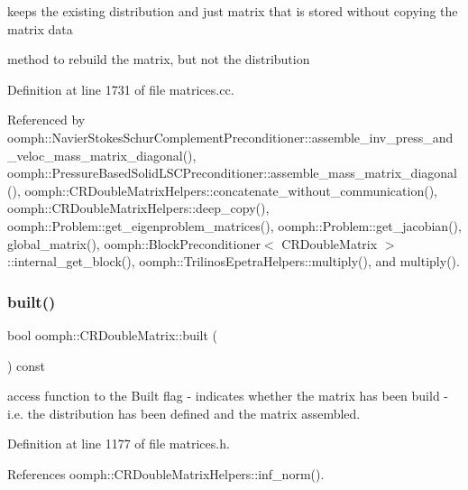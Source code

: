 keeps the existing distribution and just matrix that is stored without copying the matrix data 

method to rebuild the matrix, but not the distribution 

Definition at line 1731 of file matrices.\+cc.



Referenced by oomph\+::\+Navier\+Stokes\+Schur\+Complement\+Preconditioner\+::assemble\+\_\+inv\+\_\+press\+\_\+and\+\_\+veloc\+\_\+mass\+\_\+matrix\+\_\+diagonal(), oomph\+::\+Pressure\+Based\+Solid\+L\+S\+C\+Preconditioner\+::assemble\+\_\+mass\+\_\+matrix\+\_\+diagonal(), oomph\+::\+C\+R\+Double\+Matrix\+Helpers\+::concatenate\+\_\+without\+\_\+communication(), oomph\+::\+C\+R\+Double\+Matrix\+Helpers\+::deep\+\_\+copy(), oomph\+::\+Problem\+::get\+\_\+eigenproblem\+\_\+matrices(), oomph\+::\+Problem\+::get\+\_\+jacobian(), global\+\_\+matrix(), oomph\+::\+Block\+Preconditioner$<$ C\+R\+Double\+Matrix $>$\+::internal\+\_\+get\+\_\+block(), oomph\+::\+Trilinos\+Epetra\+Helpers\+::multiply(), and multiply().

\mbox{\label{classoomph_1_1CRDoubleMatrix_aa0503bc64ef0ccb60cb7d7e645425a62}} 
\subsubsection{\texorpdfstring{built()}{built()}}
{\footnotesize\ttfamily bool oomph\+::\+C\+R\+Double\+Matrix\+::built (\begin{DoxyParamCaption}{ }\end{DoxyParamCaption}) const\hspace{0.3cm}{\ttfamily [inline]}}



access function to the Built flag -\/ indicates whether the matrix has been build -\/ i.\+e. the distribution has been defined and the matrix assembled. 



Definition at line 1177 of file matrices.\+h.



References oomph\+::\+C\+R\+Double\+Matrix\+Helpers\+::inf\+\_\+norm().




